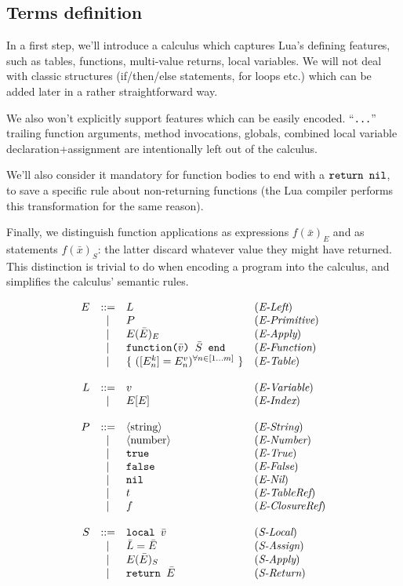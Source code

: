 \subsection{Terms definition}

In a first step, we'll introduce a calculus which captures Lua's
defining features, such as tables, functions, multi-value returns,
local variables. We will not deal with classic structures
(if/then/else statements, for loops etc.) which can be added later in
a rather straightforward way.

We also won't explicitly support features which can be easily
encoded. ``{\tt ...}'' trailing function arguments, method
invocations, globals, combined local variable declaration+assignment
are intentionally left out of the calculus.

We'll also consider it mandatory for function bodies to end with a
$\texttt{return\ }\texttt{nil}$, to save a specific rule about non-returning
functions (the Lua compiler performs this transformation for the same
reason).

Finally, we distinguish function applications as expressions $f(\bar
x)_E$ and as statements $f(\bar x)_S$: the latter discard whatever
value they might have returned. This distinction is trivial to do when
encoding a program into the calculus, and simplifies the calculus'
semantic rules.

$$
\begin{array}{rcll}
E &::=& L & (\textit{E-Left}) \\
  &|&   P & (\textit{E-Primitive}) \\
  &|&   E(\bar E)_E & (\textit{E-Apply}) \\
  &|&   \texttt{function(}\bar v\texttt{)\ }\bar S\texttt{\ end}  & (\textit{E-Function}) \\
  &|&   \{\  ([E^k_n]=E^v_n)^{\forall n\in[1...m]} \ \} & (\textit{E-Table}) \\
~\\
L &::=& v & (\textit{E-Variable}) \\
  &|&   E[E] & (\textit{E-Index}) \\
~\\
P &::=& \langle\textrm{string}\rangle & (\textit{E-String}) \\
  &|&   \langle\textrm{number}\rangle & (\textit{E-Number}) \\
  &|&   \texttt{true} & (\textit{E-True}) \\
  &|&   \texttt{false} & (\textit{E-False}) \\
  &|&   \texttt{nil} & (\textit{E-Nil}) \\
  &|&   t & (\textit{E-TableRef}) \\
  &|&   f & (\textit{E-ClosureRef}) \\
~\\
S &::=& \texttt{local\ }\bar v & (\textit{S-Local}) \\
  &|&   \bar L = \bar E & (\textit{S-Assign}) \\
  &|&   E(\bar E)_S & (\textit{S-Apply}) \\
  &|&   \texttt{return\ }\bar E & (\textit{S-Return}) \\
\end{array}
$$

